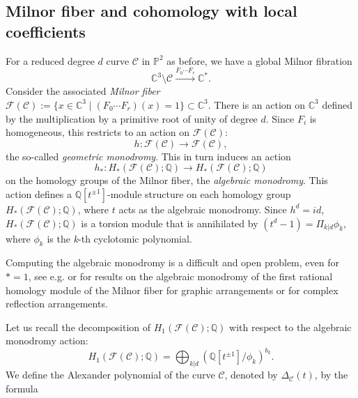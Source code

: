 \documentclass[11pt]{amsart}
\def\cC{\mathcal{C}}
\def\cF{\mathcal{F}}
\theoremstyle{plain}
\theoremstyle{definition}
\begin{document}

\subsection{Milnor fiber and cohomology with local coefficients}
\label{ss:milnor&local_coeff}
For a reduced degree $d$ curve $\mathcal{C}$ in $\mathbb{P}^2$ as before, we have a global Milnor fibration $$\mathbb{C}^3 \setminus \mathcal{C}\xrightarrow{F_0 \cdots F_r}\mathbb{C}^*.$$  Consider the associated  {\it Milnor fiber} $\cF(\cC):= \{x\in\mathbb{C}^3\mid (F_0 \cdots F_r)(x)=1\}\subset\mathbb{C}^3$.
There is an action on $\mathbb{C}^{3}$ defined by the multiplication by a primitive root of unity of degree $d$. Since $F_i$ is homogeneous, this restricts to an action on $\cF(\cC)$:
$$h: \cF(\cC) \rightarrow \cF(\cC),$$
 the so-called {\it geometric monodromy}. This in turn induces an action 
$$h_*: H_*(\cF(\cC); \mathbb{Q})  \rightarrow H_*(\cF(\cC); \mathbb{Q})$$
 on the homology groups of the Milnor fiber, the {\it algebraic monodromy}. This action defines a $\mathbb{Q}[t^{\pm 1}]$-module structure on each homology group $H_*(\cF(\cC); \mathbb{Q})$, where $t$ acts as the algebraic monodromy. Since $h^d = id$,  $H_*(\cF(\cC); \mathbb{Q})$ is a torsion module that is annihilated by $(t^d-1) = \Pi_{k | d} \phi_k$, where $\phi_k$ is the {\it k}-th cyclotomic  polynomial.

Computing the algebraic monodromy is a difficult and open problem, even for $*=1$, see e.g. \cite{MP} or \cite{MPP} for results on the algebraic monodromy of the first rational homology module of the Milnor fiber for graphic arrangements or for complex reflection arrangements.

Let us recall the decomposition of $H_1(\cF(\cC); \mathbb{Q})$ with respect to the algebraic monodromy action:
$$
H_1(\cF(\cC);\mathbb{Q}) = \bigoplus_{k | d} (\mathbb{Q}[t^{\pm 1}]/ \phi_k)^{b_k}.
$$
We define the Alexander polynomial of the curve $\mathcal{C}$, denoted by $\Delta_{\mathcal{C}}(t)$, by the formula
\end{document}

